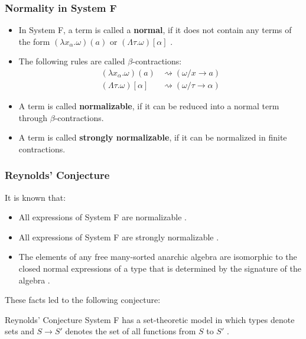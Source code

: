 \begin{frame}[fragile]
    \frametitle{Normality in System F}
  
    \begin{itemize}
        \item In System F, a term is called a \textbf{normal}, if it does not contain any terms of the form $(\lambda x_\alpha. \omega)(a)$ or $(\Lambda \tau. \omega)[\alpha]$  \cite{capretta_valentini_1999}.
        \item The following rules are called $\beta$-contractions:
        \begin{align*}
            (\lambda x_\alpha. \omega)(a) &\rightsquigarrow (\omega / x \rightarrow a) \\
            (\Lambda \tau. \omega)[\alpha] &\rightsquigarrow (\omega / \tau \rightarrow \alpha)
        \end{align*}
        \item A term is called \textbf{normalizable}, if it can be reduced into a normal term through $\beta$-contractions.
        \item A term is called \textbf{strongly normalizable}, if it can be normalized in finite contractions.
    \end{itemize}
\end{frame}

\begin{frame}[fragile]
    \frametitle{Reynolds' Conjecture}
  
    It is known that:
    \begin{itemize}
        \item All expressions of System F are normalizable \cite{girard1972phd}.
        \item All expressions of System F are strongly normalizable \cite{PRAWITZ1971235}.
        \item The elements of any free many-sorted anarchic algebra are isomorphic to the closed normal expressions of a type that is determined by the signature of the algebra \cite{BOHM1985135}.
    \end{itemize}

    These facts led to the following conjecture:
    \begin{block}{Reynolds' Conjecture}
		System F has a set-theoretic model in which types denote sets and $S \rightarrow S'$ denotes the set of all functions from $S$ to $S'$ \cite{reynolds1983types}.
	\end{block}
\end{frame}

